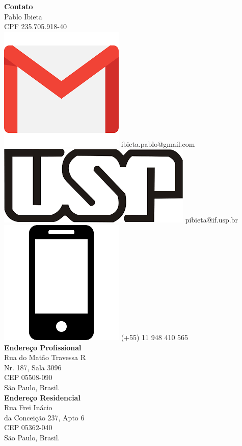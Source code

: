 \documentclass[a4paper,12pt,final]{memoir}
\begin{document}
\begin{flushleft}\small
    \vspace{10mm}
    \textbf{Contato}\\
    \vspace{1mm}
	Pablo Ibieta\\
	\vspace{1mm}
	CPF 235.705.918-40 \\
	\vspace{1mm}
    \includegraphics[width=0.07\columnwidth]{gmail_icon.png} ibieta.pablo@gmail.com \\
    \vspace{1mm}
    \includegraphics[width=0.08\columnwidth]{usp_icon.png} pibieta@if.usp.br \\
    \includegraphics[width=0.07\columnwidth]{cellphone_icon.png} (+55) 11 948 410 565 \\	
	\vspace{4mm}
	\textbf{Endereço Profissional}\\
	\vspace{1mm}
	Rua do Mat\~ao Travessa R\\
	\vspace{1mm}
	Nr. 187, Sala 3096 \\
	\vspace{1mm}
	CEP 05508-090\\
	\vspace{1mm}
	S\~{a}o Paulo, Brasil.\\
	\vspace{4mm}
	\textbf{Endereço Residencial}\\
	\vspace{1mm}
	Rua Frei In\'{a}cio \\
	\vspace{1mm}
	da Concei\c{c}\~{a}o 237, Apto 6 \\
	\vspace{1mm}
	CEP 05362-040 \\
	\vspace{1mm}
	S\~{a}o Paulo, Brasil.\\
	\vspace{4mm}

\end{flushleft}
\end{document}

